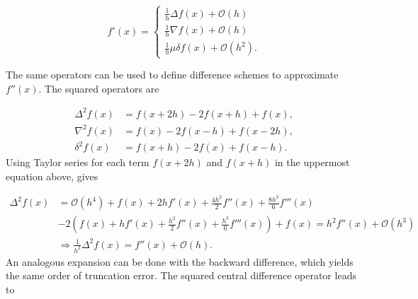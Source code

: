 
\begin{equation}
\label{Theory_approx_first_derivative}
  f'(x)=\left\{
    \begin{array}{ll}
      \frac{1}{h}\Delta f(x) + \mathcal{O}(h)\\
      \frac{1}{h}\nabla f(x) + \mathcal{O}(h) \\
      \frac{1}{h} \mu \delta f(x) + \mathcal{O}(h^2).
    \end{array}
  \right.
\end{equation}

The same operators can be used to define difference schemes to approximate $f''(x)$. The squared operators are 

\begin{equation*}
    \begin{split}
        \Delta^2 f(x) &= f(x + 2h) - 2f(x + h) + f(x), \\
        \nabla^2 f(x) &= f(x) - 2f(x -h) + f(x -2h), \\
        \delta^2 f(x) &= f(x + h) - 2f(x) + f(x - h).
    \end{split}
\end{equation*}
Using Taylor series for each term $f(x+2h)$ and $f(x+h)$ in the uppermost equation above, gives

\begin{equation*}
\begin{split}
    \Delta^2 f(x) &= \mathcal{O}(h^4) + f(x)+2hf'(x)+\frac{4h^2}{2}f''(x) + \frac{8h^3}{6}f'''(x)\\
    &-2\left(f(x)+hf'(x)+\frac{h^2}{2}f''(x)+\frac{h^3}{6}f'''(x)\right) + f(x) = h^2 f''(x) + \mathcal{O}(h^3) \\ 
    &\Rightarrow \frac{1}{h^2}\Delta^2 f(x) = f''(x) + \mathcal{O}(h).
\end{split}
\end{equation*}
An analogous expansion can be done with the backward difference, which yields the same order of truncation error. The squared central difference operator leads to


